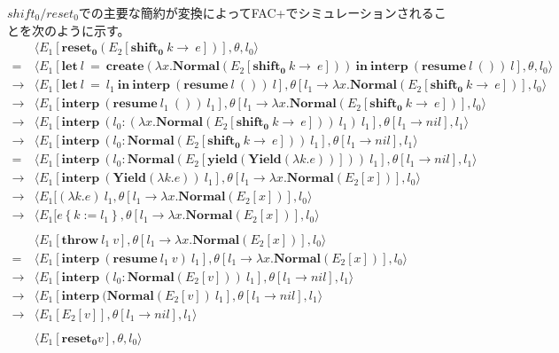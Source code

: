 \documentclass[a4j]{jsarticle}
\newcommand{\sbst}[2]{#1 \left\{ #2 \right\}}
\newcommand{\ra}{\rightarrow}
\newcommand{\interpp}[2]{\mathbf{interp}~#1~#2}
\newcommand{\resume}[2]{\mathbf{resume}~ #1 ~#2}
\newcommand{\shift}[2]{\mathbf{shift_0}~ #1\ra ~#2}
\newcommand{\create}[1]{\mathbf{create}\left(#1\right)}
\newcommand{\letin}[3]{\mathbf{let}~#1~=~#2~\mathbf{in}~#3}
\newcommand{\yield}[1]{\mathbf{yield}\left(#1\right)}
\newcommand{\fun}[2]{\lambda #1. #2}
\newcommand{\throw}[2]{\mathbf{throw}~#1~#2}
\newcommand{\reset}{\mathbf{reset_0}}
\newcommand{\Normal}{\mathbf{Normal}}
\newcommand{\Yield}{\mathbf{Yield}}
\begin{document}
\(shift_0 / reset_0\)での主要な簡約が変換によってFAC+でシミュレーションされることを次のように示す。
\begin{align*}
  & \langle E_1[\reset (E_2[\shift{k}{e}])], \theta, l_0\rangle \\
  =& \langle E_1[\letin{l}
     {\create{\lambda x.\Normal(E_2[\shift{k}{e}])}}
     {\interpp{(\resume{l}{()})}{l}}],
     \theta,
     l_0\rangle \\
  \ra& \langle E_1[\letin{l}
       {l_1}
       {\interpp{(\resume{l}{()})}{l}}],
       \theta[l_1\ra \lambda x.\Normal(E_2[\shift{k}{e}])],
       l_0\rangle \\
  \ra& \langle E_1[\interpp{(\resume{l_1}{()})}{l_1}],
       \theta[l_1\ra \lambda x.\Normal(E_2[\shift{k}{e}])],
       l_0\rangle \\
  \ra& \langle E_1[\interpp{(l_0: (\lambda x.\Normal(E_2[\shift{k}{e}])) ~l_1)  }{l_1}],
       \theta[l_1\ra nil],
       l_1\rangle \\
  \ra& \langle E_1[\interpp{(l_0: \Normal(E_2[\shift{k}{e}]))}{l_1}],
       \theta[l_1\ra nil],
       l_1\rangle \\
  =&   \langle E_1[\interpp{(l_0: \Normal(E_2[\yield{\Yield(\fun{k}{e})}]))}{l_1}],
     \theta[l_1\ra nil],
     l_1\rangle \\
  \ra & \langle E_1[\interpp{(\Yield(\fun{k}{e}))}{l_1}],
        \theta[l_1 \ra \lambda x.\Normal(E_2[x])],
        l_0\rangle \\
  \ra & \langle E_1[(\fun{k}{e})~ l_1, \theta[l_1\ra \lambda x.\Normal(E_2[x])], l_0\rangle\\
  \ra & \langle E_1[\sbst{e}{k:=l_1}, \theta[l_1\ra \lambda x.\Normal(E_2[x])], l_0\rangle\\
  \\
  &\langle E_1[\throw{l_1}{v}], \theta[l_1\ra \lambda x.\Normal(E_2[x])], l_0\rangle \\
  =& \langle E_1[\interpp{(\resume{l_1}{v})}
     {l_1}
     ],
     \theta[l_1\ra \lambda x.\Normal(E_2[x])],
     l_0\rangle \\
  \ra & \langle E_1[\interpp{(l_0 : \Normal(E_2[v]))}
        {l_1}
        ],
        \theta[l_1\ra nil],
        l_1\rangle \\
  \ra & \langle E_1[\interpp{(\Normal(E_2[v])}{l_1}], \theta[l_1\ra nil], l_1\rangle \\
  \ra & \langle E_1[E_2[v]], \theta[l_1\ra nil], l_1\rangle \\
  \\
  &\langle E_1[\reset v], \theta, l_0\rangle \\

\end{align*}
\end{document}
